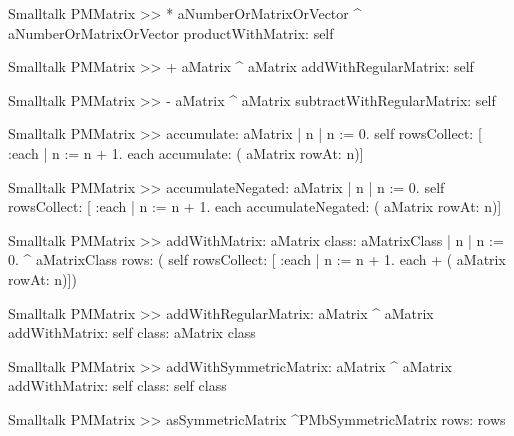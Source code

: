 \begin{displaycode}{Smalltalk}
PMMatrix >> * aNumberOrMatrixOrVector
    ^ aNumberOrMatrixOrVector productWithMatrix: self
\end{displaycode}

\begin{displaycode}{Smalltalk}
PMMatrix >> + aMatrix
    ^ aMatrix addWithRegularMatrix: self
\end{displaycode}

\begin{displaycode}{Smalltalk}
PMMatrix >> - aMatrix
    ^ aMatrix subtractWithRegularMatrix: self
\end{displaycode}

\begin{displaycode}{Smalltalk}
PMMatrix >> accumulate: aMatrix
    | n |
    n := 0.
    self rowsCollect: [ :each | n := n + 1. each accumulate: ( 
                                                    aMatrix rowAt: n)]
\end{displaycode}

\begin{displaycode}{Smalltalk}
PMMatrix >> accumulateNegated: aMatrix
    | n |
    n := 0.
    self rowsCollect: [ :each | n := n + 1. each accumulateNegated: ( 
                                                    aMatrix rowAt: n)]
\end{displaycode}

\begin{displaycode}{Smalltalk}
PMMatrix >> addWithMatrix: aMatrix class: aMatrixClass
    | n |
    n := 0.
    ^ aMatrixClass rows: ( self rowsCollect: [ :each | n := n + 1. 
                                          each + ( aMatrix rowAt: n)])
\end{displaycode}

\begin{displaycode}{Smalltalk}
PMMatrix >> addWithRegularMatrix: aMatrix
    ^ aMatrix addWithMatrix: self class: aMatrix class
\end{displaycode}

\begin{displaycode}{Smalltalk}
PMMatrix >> addWithSymmetricMatrix: aMatrix
    ^ aMatrix addWithMatrix: self class: self class
\end{displaycode}

\begin{displaycode}{Smalltalk}
PMMatrix >> asSymmetricMatrix
    ^PMbSymmetricMatrix rows: rows
\end{displaycode}

